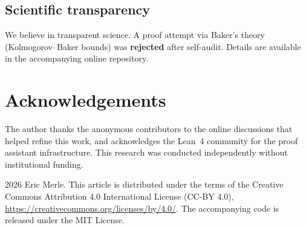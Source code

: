 \documentclass[12pt, a4paper]{amsart}
\theoremstyle{plain}
\theoremstyle{definition}
\theoremstyle{remark}
\begin{document}
\subsection{Scientific transparency}

We believe in transparent science.
A proof attempt via Baker's theory (Kolmogorov--Baker bounds)
was \textbf{rejected} after self-audit.
Details are available in the accompanying online repository.

\section*{Acknowledgements}

The author thanks the anonymous contributors to the online
discussions that helped refine this work, and acknowledges
the Lean~4 community for the proof assistant infrastructure.
This research was conducted independently without institutional
funding.

\medskip
\noindent\textcopyright{} 2026 Eric Merle.
This article is distributed under the terms of the
Creative Commons Attribution 4.0 International License (CC-BY 4.0),
\url{https://creativecommons.org/licenses/by/4.0/}.
The accompanying code is released under the MIT License.

\end{document}
